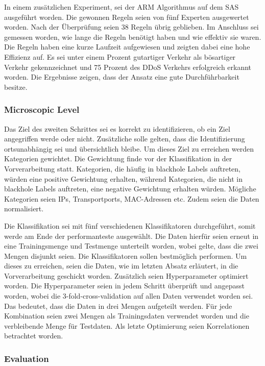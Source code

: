 \documentclass[sigplan,screen]{acmart}
\begin{document}
In einem zusätzlichen Experiment, sei der ARM Algorithmus auf dem SAS ausgeführt worden. Die gewonnen Regeln seien von fünf Experten ausgewertet worden. Nach der Überprüfung seien 38 Regeln übrig geblieben. Im Anschluss sei gemessen worden, wie lange die Regeln benötigt haben und wie effektiv sie waren. Die Regeln haben eine kurze Laufzeit aufgewiesen und zeigten dabei eine hohe Effizienz auf. Es sei unter einem Prozent gutartiger Verkehr als bösartiger Verkehr gekennzeichnet und 75 Prozent des DDoS Verkehrs erfolgreich erkannt worden. Die Ergebnisse zeigen, dass der Ansatz eine gute Durchführbarkeit besitze.

\subsubsection{Microscopic Level}
Das Ziel des zweiten Schrittes sei es korrekt zu identifizieren, ob ein Ziel angegriffen werde oder nicht. Zusätzliche solle gelten, dass die Identifizierung ortsunabhängig sei und übersichtlich bleibe. Um dieses Ziel zu erreichen werden Kategorien gewichtet. Die Gewichtung finde vor der Klassifikation in der Vorverarbeitung statt. Kategorien, die häufig in blackhole Labels auftreten, würden eine positive Gewichtung erhalten, während Kategorien, die nicht in blackhole Labels auftreten, eine negative Gewichtung erhalten würden. Mögliche Kategorien seien IPs, Transportports, MAC-Adressen etc. Zudem seien die Daten normalisiert.

Die Klassifikation sei mit fünf verschiedenen Klassifikatoren durchgeführt, somit werde am Ende der performanteste ausgewählt. Die Daten hierfür seien erneut in eine Trainingsmenge und Testmenge unterteilt worden, wobei gelte, dass die zwei Mengen disjunkt seien. Die Klassifikatoren sollen bestmöglich performen. Um dieses zu erreichen, seien die Daten, wie im letzten Absatz erläutert, in die Vorverarbeitung geschickt worden. Zusätzlich seien Hyperparameter optimiert worden. Die Hyperparameter seien in jedem Schritt überprüft und angepasst worden, wobei die 3-fold-cross-validation auf allen Daten verwendet worden sei. Das bedeutet, dass die Daten in drei Mengen aufgeteilt werden. Für jede Kombination seien zwei Mengen als Trainingsdaten verwendet worden und die verbleibende Menge für Testdaten. Als letzte Optimierung seien Korrelationen betrachtet worden.

\subsubsection{Evaluation}
\end{document}

